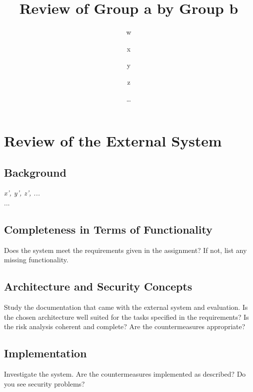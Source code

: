\documentclass{article}
\title{\huge\sffamily\bfseries Review of Group a by Group b}
\author{ w \and x \and y \and z}
\date{\dots}
\begin{document}
\maketitle


\tableofcontents
\pagebreak



\section{Review of the External System}

\subsection{Background}

 {\it x', y', z', ...} \\

 ...

\subsection{Completeness in Terms of Functionality} 

Does the system meet the requirements given in the assignment? If not, list any missing functionality.


\subsection{Architecture and Security Concepts}

Study the documentation that came with the external system and
evaluation.
Is the chosen architecture well suited for the tasks specified in the 
requirements?  Is the risk analysis coherent and complete?   Are the
countermeasures appropriate?

\subsection{Implementation}

Investigate the system. Are the countermeasures implemented as described? Do you see security problems?
\end{document}
